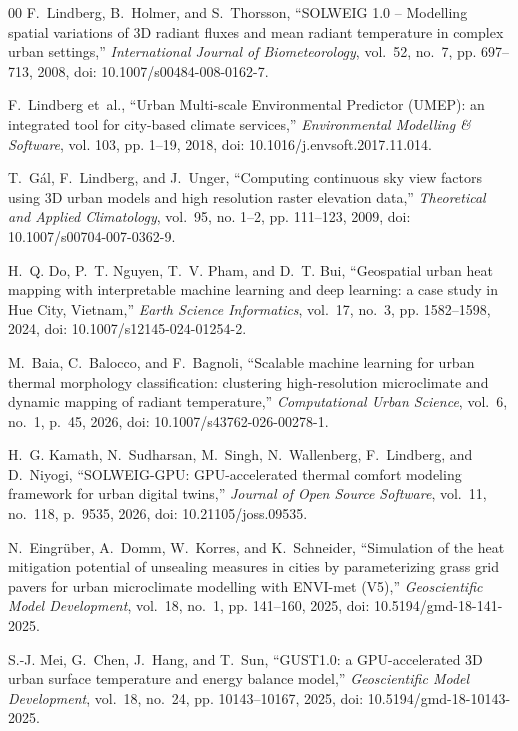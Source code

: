 \documentclass[conference]{IEEEtran}
\begin{document}
\begin{thebibliography}{00}
F.~Lindberg, B.~Holmer, and S.~Thorsson, ``SOLWEIG 1.0 -- Modelling spatial variations of 3D radiant fluxes and mean radiant temperature in complex urban settings,'' \emph{International Journal of Biometeorology}, vol.~52, no.~7, pp. 697--713, 2008, doi: 10.1007/s00484-008-0162-7.

F.~Lindberg et~al., ``Urban Multi-scale Environmental Predictor (UMEP): an integrated tool for city-based climate services,'' \emph{Environmental Modelling \& Software}, vol. 103, pp. 1--19, 2018, doi: 10.1016/j.envsoft.2017.11.014.

T.~G{\'a}l, F.~Lindberg, and J.~Unger, ``Computing continuous sky view factors using 3D urban models and high resolution raster elevation data,'' \emph{Theoretical and Applied Climatology}, vol.~95, no. 1--2, pp. 111--123, 2009, doi: 10.1007/s00704-007-0362-9.

H.~Q. Do, P.~T. Nguyen, T.~V. Pham, and D.~T. Bui, ``Geospatial urban heat mapping with interpretable machine learning and deep learning: a case study in Hue City, Vietnam,'' \emph{Earth Science Informatics}, vol.~17, no.~3, pp. 1582--1598, 2024, doi: 10.1007/s12145-024-01254-2.

M.~Baia, C.~Balocco, and F.~Bagnoli, ``Scalable machine learning for urban thermal morphology classification: clustering high-resolution microclimate and dynamic mapping of radiant temperature,'' \emph{Computational Urban Science}, vol.~6, no.~1, p.~45, 2026, doi: 10.1007/s43762-026-00278-1.

H.~G. Kamath, N.~Sudharsan, M.~Singh, N.~Wallenberg, F.~Lindberg, and D.~Niyogi, ``SOLWEIG-GPU: GPU-accelerated thermal comfort modeling framework for urban digital twins,'' \emph{Journal of Open Source Software}, vol.~11, no.~118, p.~9535, 2026, doi: 10.21105/joss.09535.

N.~Eingr{\"u}ber, A.~Domm, W.~Korres, and K.~Schneider, ``Simulation of the heat mitigation potential of unsealing measures in cities by parameterizing grass grid pavers for urban microclimate modelling with ENVI-met (V5),'' \emph{Geoscientific Model Development}, vol.~18, no.~1, pp. 141--160, 2025, doi: 10.5194/gmd-18-141-2025.

S.-J. Mei, G.~Chen, J.~Hang, and T.~Sun, ``GUST1.0: a GPU-accelerated 3D urban surface temperature and energy balance model,'' \emph{Geoscientific Model Development}, vol.~18, no.~24, pp. 10143--10167, 2025, doi: 10.5194/gmd-18-10143-2025.


\end{thebibliography}
\end{document}
